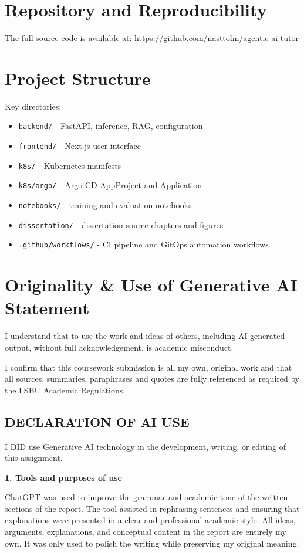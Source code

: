 \begin{appendices}
\section{Repository and Reproducibility}
The full source code is available at:
\url{https://github.com/nasttolm/agentic-ai-tutor}

\section{Project Structure}
Key directories:
\begin{itemize}
  \item \texttt{backend/} - FastAPI, inference, RAG, configuration
  \item \texttt{frontend/} - Next.js user interface
  \item \texttt{k8s/} - Kubernetes manifests
  \item \texttt{k8s/argo/} - Argo CD AppProject and Application
  \item \texttt{notebooks/} - training and evaluation notebooks
  \item \texttt{dissertation/} - dissertation source chapters and figures
  \item \texttt{.github/workflows/} - CI pipeline and GitOps automation workflows
\end{itemize}

\section{Originality \& Use of Generative AI Statement}

I understand that to use the work and ideas of others, including AI-generated output, without full acknowledgement, is academic misconduct.

I confirm that this coursework submission is all my own, original work and that all sources, summaries, paraphrases and quotes are fully referenced as required by the LSBU Academic Regulations.

\subsection{DECLARATION OF AI USE}
I DID use Generative AI technology in the development, writing, or editing of this assignment.

\textbf{1. Tools and purposes of use}
 
ChatGPT was used to improve the grammar and academic tone of the written sections of the report. The tool assisted in rephrasing sentences and ensuring that explanations were presented in a clear and professional academic style. All ideas, arguments, explanations, and conceptual content in the report are entirely my own. It was only used to polish the writing while preserving my original meaning.


\end{appendices}
